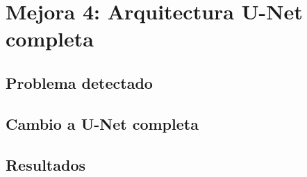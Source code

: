 \chapter{Mejora 4: Arquitectura U-Net completa}\label{full_unet}

\section{Problema detectado}\label{sec:full_unet_problem}

\section{Cambio a U-Net completa}\label{sec:full_unet_change}

\section{Resultados}\label{sec:full_unet_resultados}

